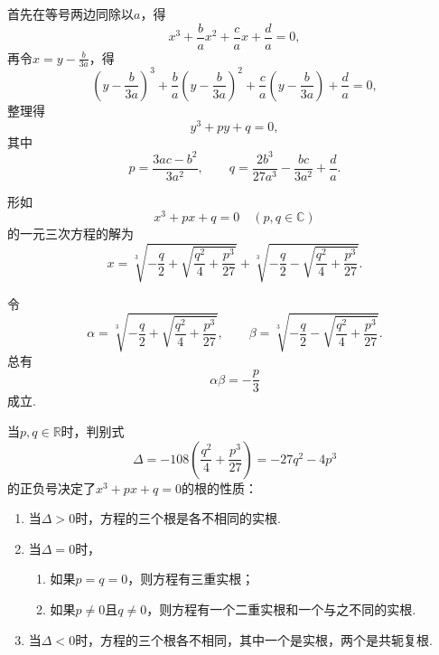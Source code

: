 首先在等号两边同除以\(a\)，得\[
x^3+\frac{b}{a}x^2+\frac{c}{a}x+\frac{d}{a}=0,
\]再令\(x=y-\frac{b}{3a}\)，得\[
\left(y-\frac{b}{3a}\right)^3+\frac{b}{a}\left(y-\frac{b}{3a}\right)^2+\frac{c}{a}\left(y-\frac{b}{3a}\right)+\frac{d}{a}=0,
\]整理得\[
y^3+py+q=0,
\]其中\[
p = \frac{3ac-b^2}{3a^2}, \qquad
q = \frac{2b^3}{27a^3}-\frac{bc}{3a^2}+\frac{d}{a}.
\]

\begin{theorem}[卡丹公式]
\def\a{-\frac{q}{2}}%
\def\d{\frac{q^2}{4}+\frac{p^3}{27}}
\def\b{\sqrt{\d}}%
\def\c#1{\sqrt[3]{\a#1\b}}%
形如\[
x^3 + px + q = 0 \quad (p,q \in \mathbb{C})
\]的一元三次方程的解为\[
x = \c{+}+\c{-}.
\]

令\[
\alpha=\c{+}, \qquad \beta=\c{-}.
\]总有\[
\alpha \beta = -\frac{p}{3}
\]成立.

当\(p,q\in\mathbb{R}\)时，判别式\[
\Delta = -108\left(\d\right) = -27q^2-4p^3
\]的正负号决定了\(x^3+px+q=0\)的根的性质：\begin{enumerate}
\item 当\(\Delta>0\)时，方程的三个根是各不相同的实根.
\item 当\(\Delta=0\)时，\begin{enumerate}
	\item 如果\(p=q=0\)，则方程有三重实根；
	\item 如果\(p\neq0\)且\(q\neq0\)，则方程有一个二重实根和一个与之不同的实根.
	\end{enumerate}
\item 当\(\Delta<0\)时，方程的三个根各不相同，其中一个是实根，两个是共轭复根.
\end{enumerate}
\end{theorem}
